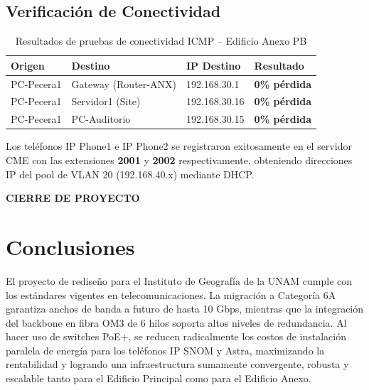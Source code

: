 \documentclass[11pt, letterpaper]{article}
\begin{document}
\subsection*{Verificación de Conectividad}

\begin{table}[h!]
\centering
{}
\renewcommand{\arraystretch}{1.3}
\begin{tabularx}{\textwidth}{@{} l l l l @{}}
\toprule
\rowcolor{OroUNAM!20}
\textbf{Origen} & \textbf{Destino} & \textbf{IP Destino} & \textbf{Resultado} \\ \midrule
PC-Pecera1 & Gateway (Router-ANX) & 192.168.30.1 & \textcolor{green!60!black}{\textbf{0\% pérdida}} \\
PC-Pecera1 & Servidor1 (Site) & 192.168.30.16 & \textcolor{green!60!black}{\textbf{0\% pérdida}} \\
PC-Pecera1 & PC-Auditorio & 192.168.30.15 & \textcolor{green!60!black}{\textbf{0\% pérdida}} \\ \bottomrule
\end{tabularx}
\caption{Resultados de pruebas de conectividad ICMP -- Edificio Anexo PB}
\end{table}

Los teléfonos IP Phone1 e IP Phone2 se registraron exitosamente en el servidor CME con las extensiones \textbf{2001} y \textbf{2002} respectivamente, obteniendo direcciones IP del pool de VLAN 20 (192.168.40.x) mediante DHCP.

\vspace{1cm}
\begin{tcolorbox}[enhanced, colback=AzulUNAM, colframe=AzulUNAM, arc=0mm, 
                  halign=center, valign=center, top=4mm, bottom=4mm]
    \LARGE\bfseries\color{white} CIERRE DE PROYECTO
\end{tcolorbox}
\vspace{0.5cm}

\section{Conclusiones}
El proyecto de rediseño para el Instituto de Geografía de la UNAM cumple con los estándares vigentes en telecomunicaciones. La migración a Categoría 6A garantiza anchos de banda a futuro de hasta 10 Gbps, mientras que la integración del backbone en fibra OM3 de 6 hilos soporta altos niveles de redundancia. Al hacer uso de switches PoE+, se reducen radicalmente los costos de instalación paralela de energía para los teléfonos IP SNOM y Astra, maximizando la rentabilidad y logrando una infraestructura sumamente convergente, robusta y escalable tanto para el Edificio Principal como para el Edificio Anexo.
\end{document}
